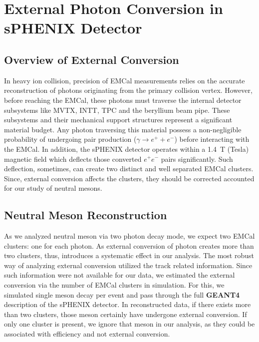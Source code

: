 
\chapter{External Photon Conversion in sPHENIX Detector}
\label{app:external_conversion}

\section{Overview of External Conversion}

In heavy ion collision, precision of \ac{EMCal} measurements relies on the accurate reconstruction of photons originating from the primary collision vertex. However, before reaching the \ac{EMCal}, these photons must traverse the internal detector subsystems like \ac{MVTX}, \ac{INTT}, \ac{TPC} and the beryllium beam pipe. These subsystems and their mechanical support structures represent a significant material budget. Any photon traversing this material possess a non-negligible probability of undergoing pair production ($\gamma \rightarrow e^+ + e^-$) before interacting with the \ac{EMCal}. In addition, the \ac{sPHENIX} detector operates within a 1.4~T (Tesla) magnetic field which deflects those converted $e^+ e^-$ pairs significantly. Such deflection, sometimes, can create two distinct and well separated \ac{EMCal} clusters. Since, external conversion affects the clusters, they should be corrected accounted for our study of neutral mesons.

\section{Neutral Meson Reconstruction}

As we analyzed neutral meson via two photon decay mode, we expect two \ac{EMCal} clusters: one for each photon. As external conversion of photon creates more than two clusters, thus, introduces a systematic effect in our analysis. The most robust way of analyzing external conversion utilized the track related information. Since such information were not available for our data, we estimated the external conversion via the number of \ac{EMCal} clusters in simulation. For this, we simulated single meson decay per event and pass through the full \textbf{GEANT4} description of the \ac{sPHENIX} detector. In reconstructed data, if there exists more than two clusters, those meson certainly have undergone external conversion. If only one cluster is present, we ignore that meson in our analysis, as they could be associated with efficiency and not external conversion.

